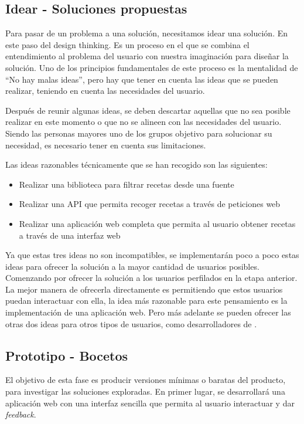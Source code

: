 \begin{enumerate}
\subsection{Idear - Soluciones propuestas}
Para pasar de un problema a una solución, necesitamos idear una solución. En este paso del design thinking. Es un proceso en el que se combina el entendimiento al problema del usuario con nuestra imaginación para diseñar la solución. Uno de los principios fundamentales de este proceso es la mentalidad de ``No hay malas ideas'', pero hay que tener en cuenta las ideas que se pueden realizar, teniendo en cuenta las necesidades del usuario. \cite{idear2023}

Después de reunir algunas ideas, se deben descartar aquellas que no sea posible realizar en este momento o que no se alineen con las necesidades del usuario. Siendo las personas mayores uno de los grupos objetivo para solucionar su necesidad, es necesario tener en cuenta sus limitaciones.

Las ideas razonables técnicamente que se han recogido son las siguientes: 
\begin{itemize}
    \item Realizar una biblioteca para filtrar recetas desde una fuente
    \item Realizar una \gls{API} que permita recoger recetas a través de peticiones web
    \item Realizar una aplicación web completa que permita al usuario obtener recetas a través de una interfaz web
\end{itemize}

Ya que estas tres ideas no son incompatibles, se implementarán poco a poco estas ideas para ofrecer la solución a la mayor cantidad de usuarios posibles. Comenzando por ofrecer la solución a los usuarios perfilados en la etapa anterior. La mejor manera de ofrecerla directamente es permitiendo que estos usuarios puedan interactuar con ella, la idea más razonable para este pensamiento es la implementación de una aplicación web. Pero más adelante se pueden ofrecer las otras dos ideas para otros tipos de usuarios, como desarrolladores de .

\subsection{Prototipo - Bocetos}
El objetivo de esta fase es producir versiones mínimas o baratas del producto, para investigar las soluciones exploradas. En primer lugar, se desarrollará una aplicación web con una interfaz sencilla que permita al usuario interactuar y dar \textit{feedback}.


\end{enumerate}

